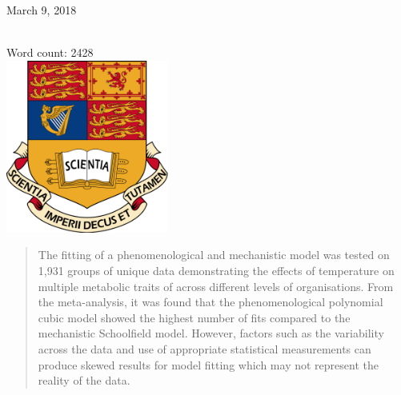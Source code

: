\begin{titlepage}


{\date \ March 9, 2018}\\[0.5cm] %
{Word count: 2428}\\[0.5cm]
\includegraphics[width=0.4\textwidth]{../Sandbox/1200px-Imperial_College_London_crest_svg.png}\\[1cm] %


\vfill %

\end{titlepage}
\newpage
\linenumbers

\begin{abstract}\noindent
The fitting of a phenomenological and mechanistic model was tested on 1,931 groups of unique data demonstrating the effects of temperature on multiple metabolic traits of across different levels of organisations. From the meta-analysis, it was found that the phenomenological polynomial cubic model showed the highest number of fits compared to the mechanistic Schoolfield model. However, factors such as the variability across the data and use of appropriate statistical measurements can produce skewed results for model fitting which may not represent the reality of the data.

\end{abstract}

